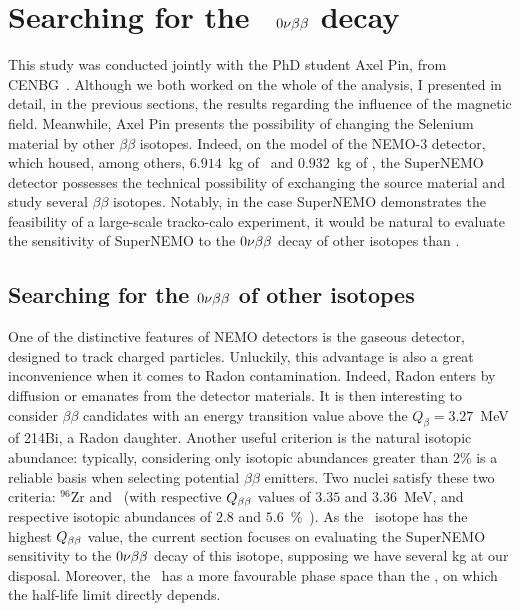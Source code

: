 \section{Searching for the \Nd\ $0\nu\beta\beta$ decay}
\label{sec:Nd}

This study was conducted jointly with the PhD student Axel Pin, from CENBG~\cite{AxelThesis}.
Although we both worked on the whole of the analysis, I presented in detail, in the previous sections, the results regarding the influence of the magnetic field.
Meanwhile, Axel Pin presents the possibility of changing the Selenium material by other $\beta\beta$ isotopes.
Indeed, on the model of the NEMO-$3$ detector, which housed, among others, $6.914$~kg of \Mo\ and $0.932$~kg of \Se, the SuperNEMO detector possesses the technical possibility of exchanging the source material and study several $\beta\beta$ isotopes.
Notably, in the case SuperNEMO demonstrates the feasibility of a large-scale tracko-calo experiment, it would be natural to  evaluate the sensitivity of SuperNEMO to the $0\nu\beta\beta$ decay of other isotopes than \Se.

\subsection{Searching for the $0\nu\beta\beta$ of other isotopes}

One of the distinctive features of NEMO detectors is the gaseous detector, designed to track charged particles.
Unluckily, this advantage is also a great inconvenience when it comes to Radon contamination.
Indeed, Radon enters by diffusion or emanates from the detector materials.
It is then interesting to consider $\beta\beta$ candidates with an energy transition value above the $Q_{\beta}=3.27$~MeV of 214Bi, a Radon daughter.
Another useful criterion is the natural isotopic abundance: typically, considering only isotopic abundances greater than 2\% is a reliable basis when selecting potential $\beta\beta$ emitters.
Two nuclei satisfy these two criteria: $^{96}$Zr and \Nd\ (with respective $Q_{\beta\beta}$ values of $3.35$ and $3.36$~MeV, and respective isotopic abundances of $2.8$ and $5.6$~\%~\cite{art:atomic_mass}).
As the \Nd\ isotope has the highest $Q_{\beta\beta}$ value, the current section focuses on evaluating the SuperNEMO sensitivity to the $0\nu\beta\beta$ decay of this isotope, supposing we have several kg at our disposal.
Moreover, the \Nd\ has a more favourable phase space than the \Se, on which the half-life limit directly depends.

